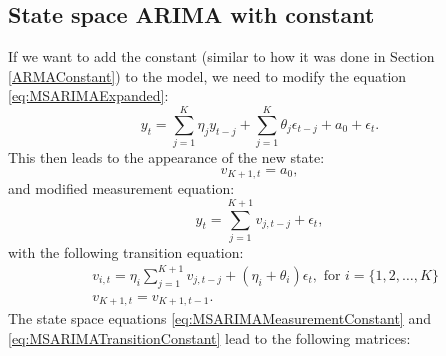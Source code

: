 \documentclass[
]{book}
\theoremstyle{definition}
\theoremstyle{definition}
\theoremstyle{definition}
\theoremstyle{definition}
\theoremstyle{remark}
\begin{document}
\hypertarget{state-space-arima-with-constant}{%
\subsection{State space ARIMA with constant}\label{state-space-arima-with-constant}}

If we want to add the constant (similar to how it was done in Section \ref{ARMAConstant}) to the model, we need to modify the equation \eqref{eq:MSARIMAExpanded}:
\begin{equation}
  y_t = \sum_{j=1}^K \eta_j y_{t-j} + \sum_{j=1}^K \theta_j \epsilon_{t-j} + a_0 + \epsilon_t .
  \label{eq:MSARIMAExpandedConstant}
\end{equation}
This then leads to the appearance of the new state:
\begin{equation}
  v_{K+1,t} = a_0 ,
  \label{eq:MSARIMAStateConstant}
\end{equation}
and modified measurement equation:
\begin{equation}
  y_t = \sum_{j=1}^{K+1} v_{j,t-j} + \epsilon_t ,
  \label{eq:MSARIMAMeasurementConstant}
\end{equation}
with the following transition equation:
\begin{equation}
  \begin{aligned}
    & v_{i,t} = \eta_i \sum_{j=1}^{K+1} v_{j,t-j} + (\eta_i + \theta_i) \epsilon_{t} , \text{ for } i=\{1, 2, \dots, K\} \\
    & v_{K+1, t} = v_{K+1, t-1} .
  \end{aligned}
  \label{eq:MSARIMATransitionConstant}
\end{equation}
The state space equations \eqref{eq:MSARIMAMeasurementConstant} and \eqref{eq:MSARIMATransitionConstant} lead to the following matrices:
\end{document}
